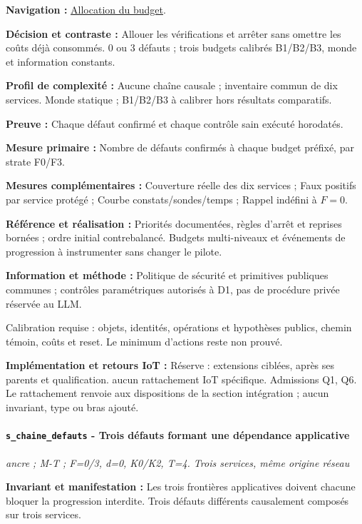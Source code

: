 \documentclass[11pt,a4paper]{article}
\newcommand{\comparisonlink}[2]{\hyperlink{comparison:#1}{#2}}
\begin{document}
\textbf{Navigation :} \comparisonlink{E15}{Allocation du budget}.

\textbf{Décision et contraste :} Allouer les vérifications et arrêter sans omettre les coûts déjà consommés. 0 ou 3 défauts ; trois budgets calibrés B1/B2/B3, monde et information constants.

\textbf{Profil de complexité :} Aucune chaîne causale ; inventaire commun de dix services. Monde statique ; B1/B2/B3 à calibrer hors résultats comparatifs.

\textbf{Preuve :} Chaque défaut confirmé et chaque contrôle sain exécuté horodatés.

\textbf{Mesure primaire :} Nombre de défauts confirmés à chaque budget préfixé, par strate F0/F3.

\textbf{Mesures complémentaires :} Couverture réelle des dix services ; Faux positifs par service protégé ; Courbe constats/sondes/temps ; Rappel indéfini à $F=0$.

\textbf{Référence et réalisation :} Priorités documentées, règles d’arrêt et reprises bornées ; ordre initial contrebalancé. Budgets multi-niveaux et événements de progression à instrumenter sans changer le pilote.

\textbf{Information et méthode :} Politique de sécurité et primitives publiques communes ; contrôles paramétriques autorisés à D1, pas de procédure privée réservée au LLM.

Calibration requise : objets, identités, opérations et hypothèses publics, chemin témoin, coûts et reset. Le minimum d’actions reste non prouvé.

\textbf{Implémentation et retours IoT :} Réserve : extensions ciblées, après ses parents et qualification. aucun rattachement IoT spécifique. Admissions Q1, Q6. Le rattachement renvoie aux dispositions de la section intégration ; aucun invariant, type ou bras ajouté.

\par\noindent\begin{minipage}{\linewidth}\setlength{\parskip}{5pt}\paragraph{\texttt{s\_chaine\_defauts} - Trois défauts formant une dépendance applicative}\label{scenario:s_chaine_defauts}
\textit{ancre ; M-T ; F=0/3, d=0, K0/K2, T=4. Trois services, même origine réseau}

\textbf{Invariant et manifestation :} Les trois frontières applicatives doivent chacune bloquer la progression interdite. Trois défauts différents causalement composés sur trois services.\par\end{minipage}\par
\end{document}
